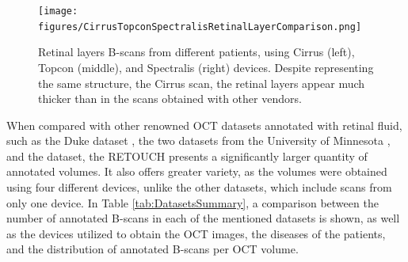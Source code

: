 \begin{figure}[!ht]
	\centering
	\texttt{[image: figures/CirrusTopconSpectralisRetinalLayerComparison.png]}
	\caption{Retinal layers B-scans from different patients, using Cirrus (left), Topcon (middle), and Spectralis (right) devices. Despite representing the same structure, the Cirrus scan, the retinal layers appear much thicker than in the scans obtained with other vendors.}
	\label{fig:CirrusTopconSpectralisRetinalLayerComparison}
\end{figure}

When compared with other renowned OCT datasets annotated with retinal fluid, such as the Duke dataset \parencite{Chiu2015}, the two datasets from the University of Minnesota \parencite{Rashno2017, Rashno2018}, and the \textcite{Lu2019} dataset, the RETOUCH presents a significantly larger quantity of annotated volumes. It also offers greater variety, as the volumes were obtained using four different devices, unlike the other datasets, which include scans from only one device. In Table \ref{tab:DatasetsSummary}, a comparison between the number of annotated B-scans in each of the mentioned datasets is shown, as well as the devices utilized to obtain the OCT images, the diseases of the patients, and the distribution of annotated B-scans per OCT volume.

